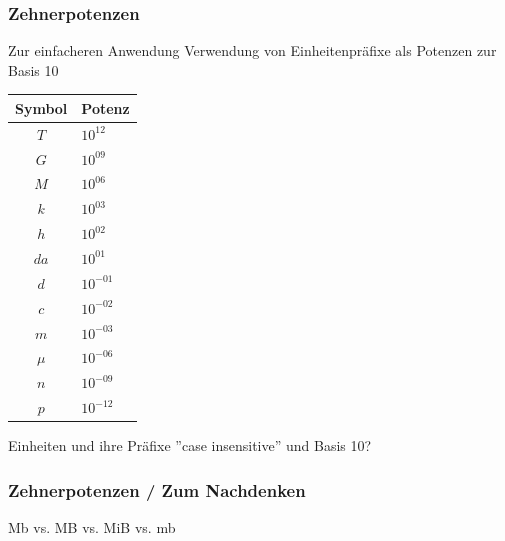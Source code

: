 \begin{frame}
    \frametitle{Zehnerpotenzen}

    Zur einfacheren Anwendung Verwendung von Einheitenpräfixe als Potenzen zur Basis 10

    \begin{center}
    \footnotesize
    \begin{tabular}{|c|l|}\hline
        \textbf{Symbol} & \textbf{Potenz} \\ \hline \hline
        $T$   & $10^{12}$  \\ \hline
        $G$   & $10^{09}$  \\ \hline
        $M$   & $10^{06}$  \\ \hline
        $k$   & $10^{03}$  \\ \hline
        $h$   & $10^{02}$  \\ \hline
        $da$  & $10^{01}$  \\ \hline
        $d$   & $10^{-01}$ \\ \hline
        $c$   & $10^{-02}$ \\ \hline
        $m$   & $10^{-03}$ \\ \hline
        $\mu$ & $10^{-06}$ \\ \hline
        $n$   & $10^{-09}$ \\ \hline
        $p$   & $10^{-12}$ \\ \hline
    \end{tabular}
    \end{center}

    Einheiten und ihre Präfixe ''case insensitive'' und Basis 10?

\end{frame}

\begin{frame}
    \frametitle{Zehnerpotenzen / Zum Nachdenken}

    \begin{block}{\begin{center}\Large Mb vs. MB vs. MiB vs. mb\end{center}}
    \end{block}

    \vspace{2em}



\end{frame}



